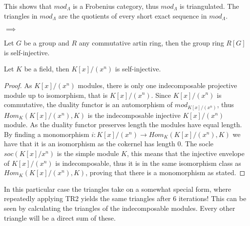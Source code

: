     This shows that $mod_{\Lambda}$ is a Frobenius category, thus \underline{$mod_{\Lambda}$} is triangulated. The triangles in \underline{$mod_{\Lambda}$} are the quotients of every short exact sequence in $mod_{\Lambda}$.
    \begin{center}
        $\implies$
    \end{center}

    \begin{prop}
        Let $G$ be a group and $R$ any commutative artin ring, then the group ring $R[G]$ is self-injective.
    \end{prop}


    \begin{prop}
        Let $K$ be a field, then $K[x]/(x^n)$ is self-injective.
    \end{prop}

    \begin{proof}
        As $K[x]/(x^n)$ modules, there is only one indecomposable projective module up to isomorphism, that is $K[x]/(x^n)$. Since $K[x]/(x^n)$ is commutative, the duality functor is an automorphism of $mod_{K[x]/(x^n)}$, thus $Hom_K(K[x]/(x^n),K)$ is the indecomposable injective $K[x]/(x^n)$ module. As the duality functor preserves length the modules have equal length. By finding a monomorphism $i:K[x]/(x^n)\rightarrow Hom_K(K[x]/(x^n),K)$ we have that it is an isomorphism as the cokernel has length $0$. The socle $soc(K[x]/x^n)$ is the simple module $K$, this means that the injective envelope of $K[x]/(x^n)$ is indecomposable, thus it is in the same isomorphism class as $Hom_K(K[x]/(x^n),K)$, proving that there is a monomorphism as stated.
    \end{proof}

    In this particular case the triangles take on a somewhat special form, where repeatedly applying TR2 yields the same triangles after 6 iterations! This can be seen by calculating the triangles of the indecomposable modules. Every other triangle will be a direct sum of these. \\

